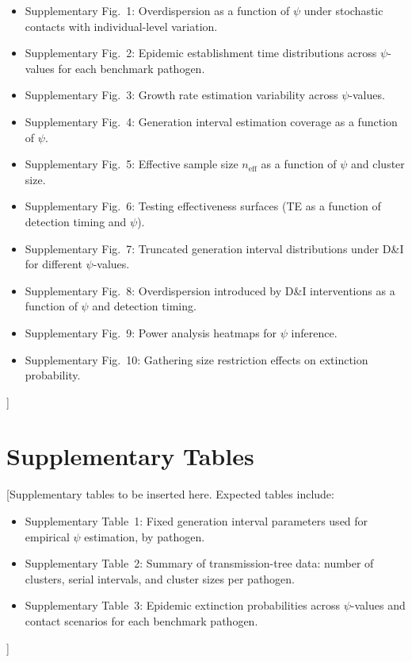 \documentclass[10pt]{article}
\begin{document}
\begin{itemize}
\item Supplementary Fig.~1: Overdispersion as a function of $\psi$ under stochastic contacts with individual-level variation.
\item Supplementary Fig.~2: Epidemic establishment time distributions across $\psi$-values for each benchmark pathogen.
\item Supplementary Fig.~3: Growth rate estimation variability across $\psi$-values.
\item Supplementary Fig.~4: Generation interval estimation coverage as a function of $\psi$.
\item Supplementary Fig.~5: Effective sample size $n_\text{eff}$ as a function of $\psi$ and cluster size.
\item Supplementary Fig.~6: Testing effectiveness surfaces (TE as a function of detection timing and $\psi$).
\item Supplementary Fig.~7: Truncated generation interval distributions under D\&I for different $\psi$-values.
\item Supplementary Fig.~8: Overdispersion introduced by D\&I interventions as a function of $\psi$ and detection timing.
\item Supplementary Fig.~9: Power analysis heatmaps for $\psi$ inference.
\item Supplementary Fig.~10: Gathering size restriction effects on extinction probability.
\end{itemize}
]


\section{Supplementary Tables}
\label{sec:supp_tables}

[Supplementary tables to be inserted here. Expected tables include:

\begin{itemize}
\item Supplementary Table~1: Fixed generation interval parameters used for empirical $\psi$ estimation, by pathogen.
\item Supplementary Table~2: Summary of transmission-tree data: number of clusters, serial intervals, and cluster sizes per pathogen.
\item Supplementary Table~3: Epidemic extinction probabilities across $\psi$-values and contact scenarios for each benchmark pathogen.
\end{itemize}
]





\end{document}
